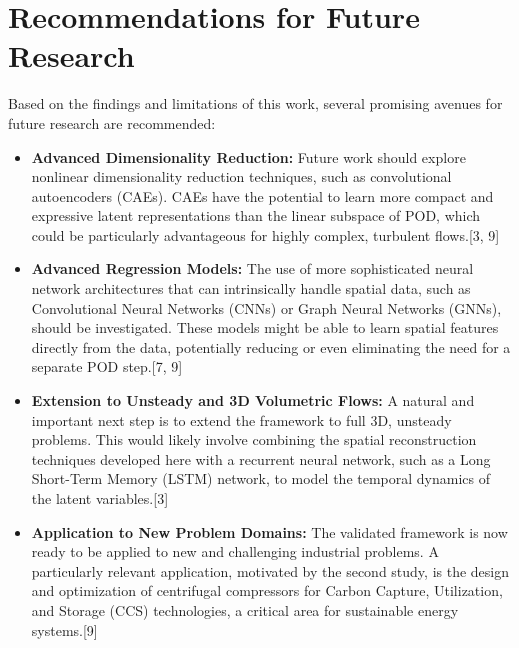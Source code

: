 \documentclass[12pt, a4paper]{report}
\begin{document}
\section{Recommendations for Future Research}
Based on the findings and limitations of this work, several promising avenues for future research are recommended:
\begin{itemize}
    \item \textbf{Advanced Dimensionality Reduction:} Future work should explore nonlinear dimensionality reduction techniques, such as convolutional autoencoders (CAEs). CAEs have the potential to learn more compact and expressive latent representations than the linear subspace of POD, which could be particularly advantageous for highly complex, turbulent flows.[3, 9]
    \item \textbf{Advanced Regression Models:} The use of more sophisticated neural network architectures that can intrinsically handle spatial data, such as Convolutional Neural Networks (CNNs) or Graph Neural Networks (GNNs), should be investigated. These models might be able to learn spatial features directly from the data, potentially reducing or even eliminating the need for a separate POD step.[7, 9]
    \item \textbf{Extension to Unsteady and 3D Volumetric Flows:} A natural and important next step is to extend the framework to full 3D, unsteady problems. This would likely involve combining the spatial reconstruction techniques developed here with a recurrent neural network, such as a Long Short-Term Memory (LSTM) network, to model the temporal dynamics of the latent variables.[3]
    \item \textbf{Application to New Problem Domains:} The validated framework is now ready to be applied to new and challenging industrial problems. A particularly relevant application, motivated by the second study, is the design and optimization of centrifugal compressors for Carbon Capture, Utilization, and Storage (CCS) technologies, a critical area for sustainable energy systems.[9]
\end{itemize}
\end{document}
